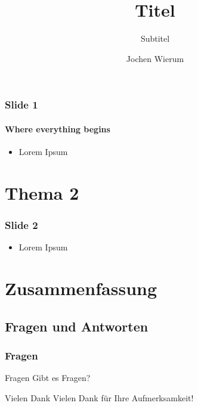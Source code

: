 \documentclass[ngerman,hyperref={pdfpagelabels=false}]{beamer}
\title{Titel}
\subtitle{Subtitel}
\author{Jochen Wierum} %
\institute[Hochschule Bonn-Rhein-Sieg]{Hochschule Bonn-Rhein-Sieg}
\date{\date{}}
\begin{document}
\begin{frame}
    \titlepage
\end{frame}

\begin{frame}
    \tableofcontents
\end{frame}


\begin{frame}
    \frametitle{Slide 1}
    \framesubtitle{Where everything begins}
    \begin{itemize}
        \item Lorem Ipsum
    \end{itemize}
\end{frame}

\section{Thema 2}

\begin{frame}
    \frametitle{Slide 2}
    \begin{itemize}
        \item Lorem Ipsum
    \end{itemize}
\end{frame}

\section{Zusammenfassung}
\subsection{Fragen und Antworten}
\begin{frame}
    \frametitle{Fragen}
    \begin{block}{Fragen}
        Gibt es Fragen?
    \end{block}
    \pause
    \begin{block}{Vielen Dank}
        Vielen Dank für Ihre Aufmerksamkeit!
    \end{block}
\end{frame}
\end{document}
